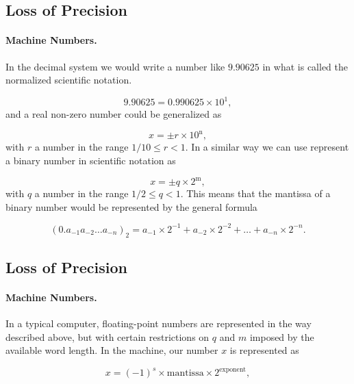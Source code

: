 \documentclass[%
oneside,                 %
final,                   %
10pt]{article}
\begin{document}
{{{{{\subsection{Loss of Precision}


\paragraph{Machine Numbers.}
In the decimal system we would write a number like $9.90625$
in what is called the normalized scientific notation.

\[
  9.90625=0.990625\times 10^{1},
\]
and a real non-zero number could be generalized as

\begin{equation}
    x=\pm r\times 10^{{\mbox{n}}},
\end{equation}
with $r$ a number in the range $1/10 \le r < 1$.
In a similar way we can use represent a binary number in
scientific notation as

\begin{equation}
    x=\pm q\times 2^{{\mbox{m}}},
\end{equation}
with $q$ a number in the range $1/2 \le q < 1$.
This means that the mantissa of a binary number would be represented by
the general formula

\begin{equation}
(0.a_{-1}a_{-2}\dots a_{-n})_2=a_{-1}\times 2^{-1}
+a_{-2}\times 2^{-2}+\dots+a_{-n}\times 2^{-n}.
\end{equation}



\subsection{Loss of Precision}


\paragraph{Machine Numbers.}
In a typical computer, floating-point numbers are represented
in the way described above, but with certain restrictions
on $q$ and $m$ imposed by the available word length.
In the machine, our
number $x$ is represented as

\begin{equation}
    x=(-1)^s\times {\mbox{mantissa}}\times 2^{{\mbox{exponent}}},
\end{equation}

}}}}}
\end{document}
